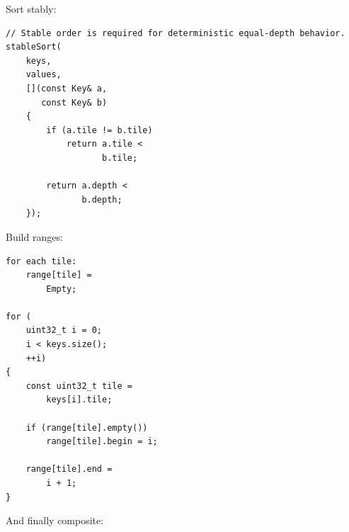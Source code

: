 Sort stably:

\protect{}\label{mm1u1e}%
\begin{verbatim}
// Stable order is required for deterministic equal-depth behavior.
stableSort(
    keys,
    values,
    [](const Key& a,
       const Key& b)
    {
        if (a.tile != b.tile)
            return a.tile <
                   b.tile;

        return a.depth <
               b.depth;
    });
\end{verbatim}

Build ranges:

\protect{}\label{gr6rum}%
\begin{verbatim}
for each tile:
    range[tile] =
        Empty;

for (
    uint32_t i = 0;
    i < keys.size();
    ++i)
{
    const uint32_t tile =
        keys[i].tile;

    if (range[tile].empty())
        range[tile].begin = i;

    range[tile].end =
        i + 1;
}
\end{verbatim}

And finally composite:


